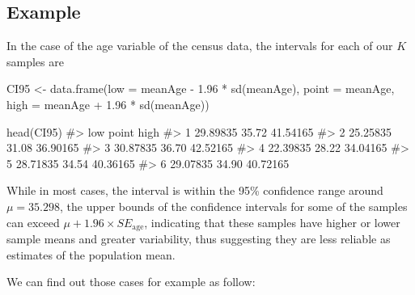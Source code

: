 \documentclass[
  letterpaper,
  DIV=11,
  numbers=noendperiod]{scrreprt}
\newenvironment{Shaded}{\begin{snugshade}}{\end{snugshade}}
\newcommand{\AttributeTok}[1]{\textcolor[rgb]{0.40,0.45,0.13}{#1}}
\newcommand{\CommentTok}[1]{\textcolor[rgb]{0.37,0.37,0.37}{#1}}
\newcommand{\FloatTok}[1]{\textcolor[rgb]{0.68,0.00,0.00}{#1}}
\newcommand{\FunctionTok}[1]{\textcolor[rgb]{0.28,0.35,0.67}{#1}}
\newcommand{\NormalTok}[1]{\textcolor[rgb]{0.00,0.23,0.31}{#1}}
\newcommand{\OtherTok}[1]{\textcolor[rgb]{0.00,0.23,0.31}{#1}}
\newcommand{\SpecialCharTok}[1]{\textcolor[rgb]{0.37,0.37,0.37}{#1}}
\begin{document}
\subsection{Example}\label{example-1}

In the case of the age variable of the census data, the intervals for
each of our \(K\) samples are

\begin{Shaded}
\begin{Highlighting}[]
\NormalTok{CI95 }\OtherTok{\textless{}{-}} \FunctionTok{data.frame}\NormalTok{(}\AttributeTok{low =}\NormalTok{ meanAge }\SpecialCharTok{{-}} \FloatTok{1.96} \SpecialCharTok{*} \FunctionTok{sd}\NormalTok{(meanAge), }
                   \AttributeTok{point =}\NormalTok{ meanAge,}
                   \AttributeTok{high =}\NormalTok{ meanAge }\SpecialCharTok{+} \FloatTok{1.96} \SpecialCharTok{*} \FunctionTok{sd}\NormalTok{(meanAge))}

\FunctionTok{head}\NormalTok{(CI95)}
\CommentTok{\#\textgreater{}        low point     high}
\CommentTok{\#\textgreater{} 1 29.89835 35.72 41.54165}
\CommentTok{\#\textgreater{} 2 25.25835 31.08 36.90165}
\CommentTok{\#\textgreater{} 3 30.87835 36.70 42.52165}
\CommentTok{\#\textgreater{} 4 22.39835 28.22 34.04165}
\CommentTok{\#\textgreater{} 5 28.71835 34.54 40.36165}
\CommentTok{\#\textgreater{} 6 29.07835 34.90 40.72165}
\end{Highlighting}
\end{Shaded}

While in most cases, the interval is within the 95\% confidence range
around \(\mu = 35.298\), the upper bounds of the confidence intervals
for some of the samples can exceed
\(\mu + 1.96 \times SE_{\text{age}}\), indicating that these samples
have higher or lower sample means and greater variability, thus
suggesting they are less reliable as estimates of the population mean.

We can find out those cases for example as follow:

\begin{Shaded}
\end{Shaded}
\end{document}
